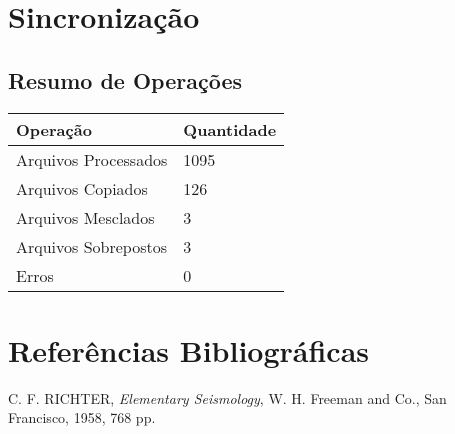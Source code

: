 \documentclass[12pt]{article}
\begin{document}
\section{Sincronização}
\subsection{Resumo de Operações}
\begin{longtable}{@{}ll@{}}
\toprule
\textbf{Operação} & \textbf{Quantidade} \\ \midrule
Arquivos Processados & 1095 \\
Arquivos Copiados    & 126 \\
Arquivos Mesclados   & 3 \\
Arquivos Sobrepostos & 3 \\
Erros               & 0 \\ \bottomrule
\end{longtable}

\section{Referências Bibliográficas}
C. F. RICHTER, \textit{Elementary Seismology}, W. H. Freeman and Co., San Francisco, 1958, 768 pp.
\end{document}
